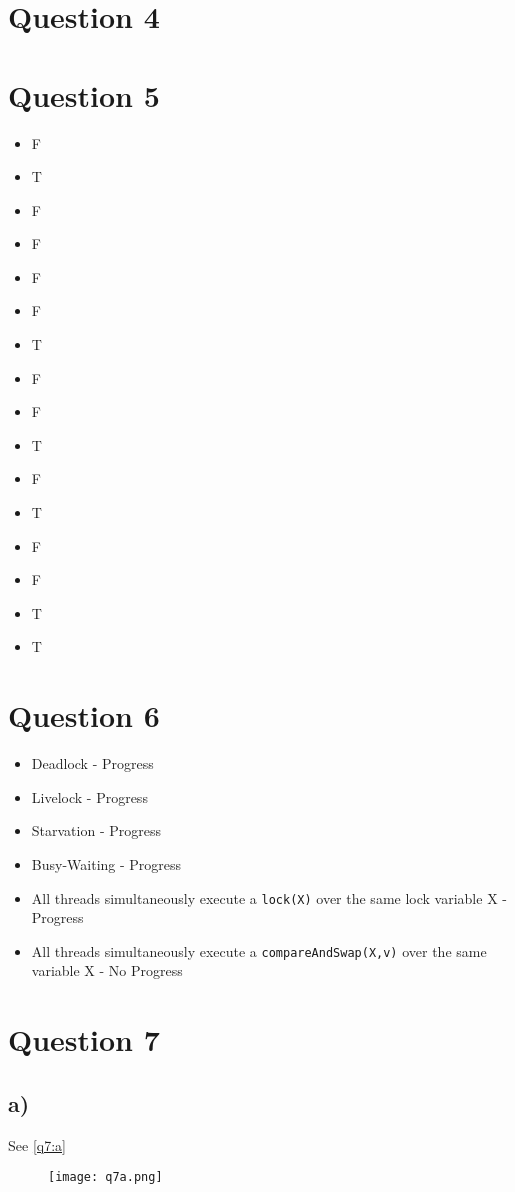 \documentclass[a4paper,twocolumn]{article}
\begin{document}
\section{Question 4}
\section{Question 5}
\begin{itemize}
    \item F
    \item T
    \item F
    \item F
    \item F
    \item F
    \item T
    \item F
    \item F
    \item T
    \item F
    \item T
    \item F
    \item F
    \item T
    \item T
\end{itemize}
\section{Question 6}
\begin{itemize}
    \item Deadlock - Progress
    \item Livelock - Progress
    \item Starvation - Progress
    \item Busy-Waiting - Progress
    \item All threads simultaneously execute a \texttt{lock(X)} over the same lock variable X - Progress
    \item All threads simultaneously execute a \texttt{compareAndSwap(X,v)} over the same variable X - No Progress
\end{itemize}
\section{Question 7}
\subsection{a)}
See \autoref{q7:a}
\begin{figure}[h]
    \centering
    \texttt{[image: q7a.png]}
    \caption{}
    \label{q7:a}
\end{figure}
\end{document}
